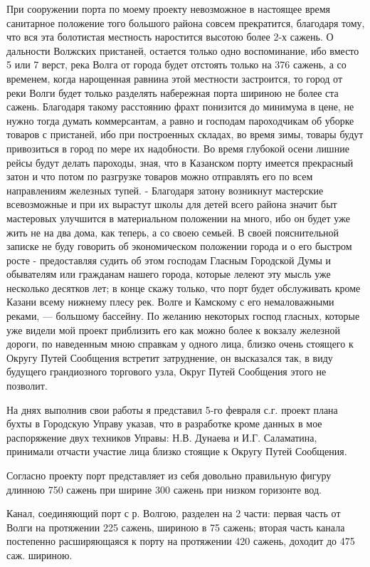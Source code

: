 \documentclass[oneside,final,14pt]{extreport}
\begin{document}
	При сооружении порта по моему проекту невозможное в настоящее время санитарное положение того большого района совсем прекратится, благодаря тому, что вся эта болотистая местность наростится высотою более 2-х сажень. О дальности Волжских пристаней, остается только одно воспоминание, ибо вместо 5 или 7 верст, река Волга от города будет отстоять только на 376 сажень, а со временем, когда нарощенная равнина этой местности застроится, то город от реки Волги будет только разделять набережная порта шириною не более ста сажень. Благодаря такому расстоянию фрахт понизится до минимума в цене, не нужно тогда думать коммерсантам, а равно и господам пароходчикам об уборке товаров с пристаней, ибо при построенных складах, во время зимы, товары будут привозиться в город по мере их надобности. Во время глубокой осени лишние рейсы будут делать пароходы, зная, что в Казанском порту имеется прекрасный затон и что потом по разгрузке товаров можно отправлять его по всем направлениям железных тупей. - Благодаря затону возникнут мастерские всевозможные и при их вырастут школы для детей всего района значит быт мастеровых улучшится в материальном положении на много, ибо он будет уже жить не на два дома, как теперь, а со своею семьей. В своей пояснительной записке не буду говорить об экономическом положении города и о его быстром росте - предоставляя судить об этом господам Гласным Городской Думы и обывателям или гражданам нашего города, которые лелеют эту мысль уже несколько десятков лет; в конце скажу только, что порт будет обслуживать кроме Казани всему нижнему плесу рек. Волге и Камскому с его немаловажными реками, — большому бассейну. По желанию некоторых господ гласных, которые уже видели мой проект приблизить его как можно более к вокзалу железной дороги, по наведенным мною справкам у одного лица, близко очень стоящего к Округу Путей Сообщения встретит затруднение, он высказался так, в виду будущего грандиозного торгового узла, Округ Путей Сообщения этого не позволит.
	
	На днях выполнив свои работы я представил 5-го февраля с.г. проект плана бухты в Городскую Управу указав, что в разработке кроме данных в мое распоряжение двух техников Управы: Н.В. Дунаева и И.Г. Саламатина, принимали отчасти участие лица близко стоящие к Округу Путей Сообщения.
	
	Согласно проекту порт представляет из себя довольно правильную фигуру длинною 750 сажень при ширине 300 сажень при низком горизонте вод.
	
	Канал, соединяющий порт с р. Волгою, разделен на 2 части: первая часть от Волги на протяжении 225 сажень, шириною в 75 сажень; вторая часть канала постепенно расширяющаяся к порту на протяжении 420 сажень, доходит до 475 саж. шириною.
	
\end{document}
